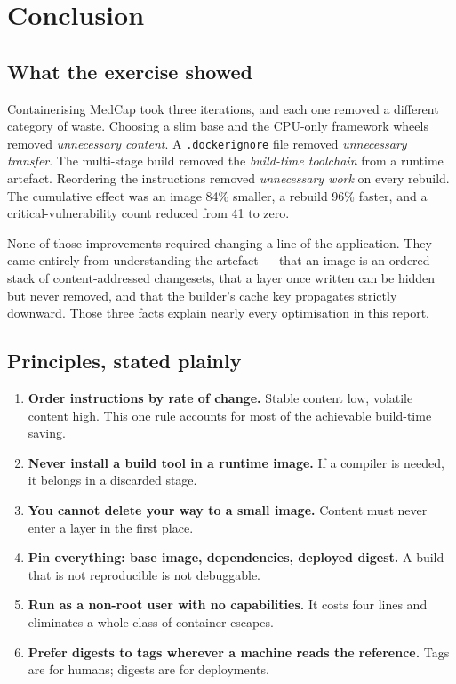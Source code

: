 \documentclass[10pt,a4paper]{article}
\begin{document}
\section{Conclusion}

\subsection{What the exercise showed}

Containerising MedCap took three iterations, and each one removed a
different category of waste. Choosing a slim base and the CPU-only
framework wheels removed \emph{unnecessary content}. A
\texttt{.dockerignore} file removed \emph{unnecessary transfer}. The
multi-stage build removed the \emph{build-time toolchain} from a runtime
artefact. Reordering the instructions removed \emph{unnecessary work} on
every rebuild. The cumulative effect was an image 84\% smaller, a
rebuild 96\% faster, and a critical-vulnerability count reduced from 41
to zero.

None of those improvements required changing a line of the application.
They came entirely from understanding the artefact --- that an image is
an ordered stack of content-addressed changesets, that a layer once
written can be hidden but never removed, and that the builder's cache
key propagates strictly downward. Those three facts explain nearly every
optimisation in this report.

\subsection{Principles, stated plainly}

\begin{enumerate}[leftmargin=1.6em,itemsep=3pt]
  \item \textbf{Order instructions by rate of change.} Stable content
        low, volatile content high. This one rule accounts for most of
        the achievable build-time saving.
  \item \textbf{Never install a build tool in a runtime image.} If a
        compiler is needed, it belongs in a discarded stage.
  \item \textbf{You cannot delete your way to a small image.} Content
        must never enter a layer in the first place.
  \item \textbf{Pin everything: base image, dependencies, deployed
        digest.} A build that is not reproducible is not debuggable.
  \item \textbf{Run as a non-root user with no capabilities.} It costs
        four lines and eliminates a whole class of container escapes.
  \item \textbf{Prefer digests to tags wherever a machine reads the
        reference.} Tags are for humans; digests are for deployments.
\end{enumerate}
\end{document}
